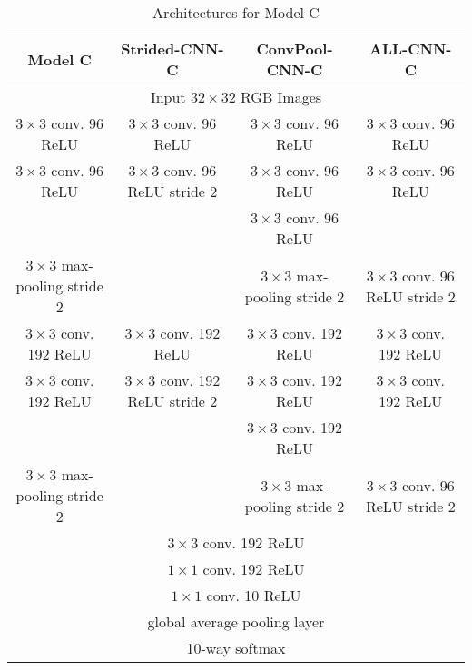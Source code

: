 \begin{table*}
  \centering
  \begin{tabular}{|c|c|c|c|}
    \hline
    Model C & Strided-CNN-C & ConvPool-CNN-C & ALL-CNN-C \\
    \hline
    \multicolumn{4}{|c|}{Input $32\times32$ RGB Images} \\
    \hline
    $3\times3$ conv. 96 ReLU & $3\times3$ conv. 96 ReLU &  $3\times3$ conv. 96 ReLU & $3\times3$ conv. 96 ReLU \\
    $3\times3$ conv. 96 ReLU & $3\times3$ conv. 96 ReLU stride 2 &  $3\times3$ conv. 96 ReLU & $3\times3$ conv. 96 ReLU \\
    & & $3\times3$ conv. 96 ReLU & \\
    \hline
    $3\times3$ max-pooling stride 2 & & $3\times3$ max-pooling stride 2& $3\times3$ conv. 96 ReLU stride 2 \\
    \hline
    $3\times3$ conv. 192 ReLU & $3\times3$ conv. 192 ReLU &  $3\times3$ conv. 192 ReLU & $3\times3$ conv. 192 ReLU \\
    $3\times3$ conv. 192 ReLU & $3\times3$ conv. 192 ReLU stride 2 &  $3\times3$ conv. 192 ReLU & $3\times3$ conv. 192 ReLU \\
    & & $3\times3$ conv. 192 ReLU & \\
    \hline
    $3\times3$ max-pooling stride 2 & & $3\times3$ max-pooling stride 2& $3\times3$ conv. 96 ReLU stride 2 \\
    \hline
    \multicolumn{4}{|c|}{$3\times3$ conv. 192 ReLU} \\
    \hline
    \multicolumn{4}{|c|}{$1\times1$ conv. 192 ReLU} \\
    \hline
    \multicolumn{4}{|c|}{$1\times1$ conv. 10 ReLU} \\
    \hline
    \multicolumn{4}{|c|}{global average pooling layer} \\
    \hline
    \multicolumn{4}{|c|}{10-way softmax} \\
    \hline
  \end{tabular}
  \caption{Architectures for Model C}
  \label{tab:modelC}
\end{table*}